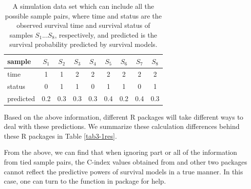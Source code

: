 \begin{table}[!ht]
\centering
\begin{tabular}{lcccccccc}
\hline
\textbf{sample} & $S_1$  & $S_2$  & $S_3$  & $S_4$  & $S_5$  & $S_6$  & $S_7$  & $S_8$  \\ \hline
\textsf{time}      & 1   & 1   & 2   & 2   & 2   & 2   & 2   & 2   \\

\textsf{status}    & 0   & 1   & 1   & 0   & 1   & 1   & 0   & 1   \\

\textsf{predicted} & 0.2 & 0.3 & 0.3 & 0.3 & 0.4 & 0.2 & 0.4 & 0.3\\
\hline
\end{tabular}
\caption{
\noindent A simulation data set which can include all the possible sample pairs, where \textsf{time} and \textsf{status} are the observed survival time and survival status of samples $S_1...S_8$, respectively, and \textsf{predicted} is the survival probability predicted by survival models.}\label{tab3-1data}
\end{table}

Based on the above information, different R packages will take different ways to deal with these predictions. We summarize these calculation differences behind these R packages in Table \ref{tab3-1res}.

\begin{table}[!ht]
  \centering
\caption{
Differences of C-index calculated by the  package, the  package, the  package and the  package.}\label{tab3-1res}
\end{table}

From the above, we can find that when ignoring part or all of the information from tied sample pairs, the C-index values obtained from  and other two packages cannot reflect the predictive powers of survival models in a true manner. In this case, one can turn to the  function in  package for help.

